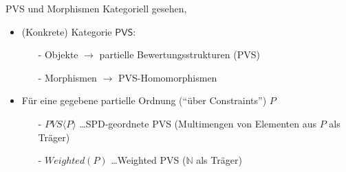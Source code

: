 \documentclass[handout,10pt,xcolor={dvipsnames},fleqn]{beamer}
\begin{document}
\begin{frame}{PVS und Morphismen}
Kategoriell gesehen, 
\begin{itemize}
\item (Konkrete) Kategorie $\mathsf{PVS}$: 
\begin{itemize}
\item[-] Objekte $\rightarrow$ partielle Bewertungsstrukturen (PVS) 
\item[-] Morphismen $\rightarrow$ PVS-Homomorphismen
\end{itemize}
\item Für eine gegebene partielle Ordnung (``über Constraints'') $P$
\begin{itemize}
\item[-]  $\mathit{PVS}\langle P \rangle$ \ldots SPD-geordnete PVS (Multimengen von Elementen aus $P$ als Träger)
\item[-] $\mathit{Weighted}(P)$ \ldots Weighted PVS ($\mathbb{N}$ als Träger)
\end{itemize}  
\end{itemize}
\begin{center}
\end{center}
\end{frame}
\end{document}
